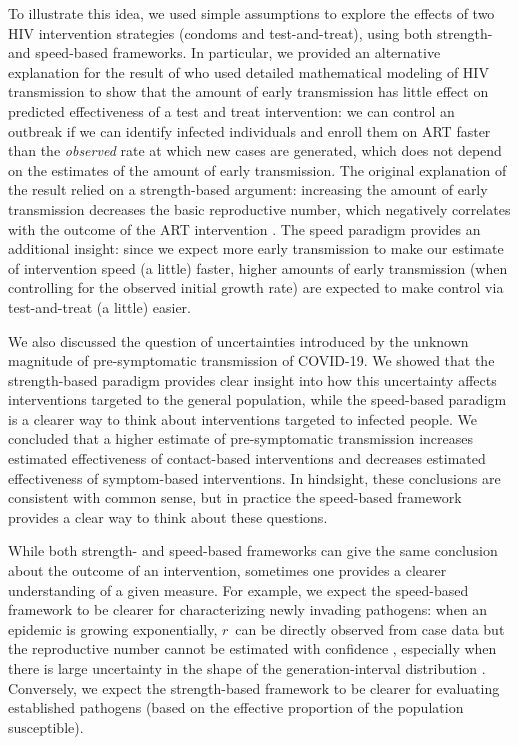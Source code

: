 \documentclass[12pt]{article}
\newcommand{\rr}{\ensuremath{{r}}}
\begin{document}
To illustrate this idea, we used simple assumptions to explore the effects of two HIV intervention strategies (condoms and test-and-treat), using both strength- and speed-based frameworks.
In particular, we provided an alternative explanation for the result of \cite{eaton2014proportion} who used detailed mathematical modeling of HIV transmission to show that the amount of early transmission has little effect on predicted effectiveness of a test and treat intervention:
we can control an outbreak if we can identify infected individuals and enroll them on ART faster than the \emph{observed} rate at which new cases are generated, which does not depend on the estimates of the amount of early transmission.
The original explanation of the result relied on a strength-based argument: increasing the amount of early transmission decreases the basic reproductive number, which negatively correlates with the outcome of the ART intervention \citep{eaton2014proportion}.
The speed paradigm provides an additional insight: since we expect more early transmission to make our estimate of intervention speed (a little) faster, higher amounts of early transmission (when controlling for the observed initial growth rate) are expected to make control via test-and-treat (a little) easier.

We also discussed the question of uncertainties introduced by the unknown magnitude of pre-symptomatic transmission of COVID-19. We showed that the strength-based paradigm provides clear insight into how this uncertainty affects interventions targeted to the general population, while the speed-based paradigm is a clearer way to think about interventions targeted to infected people. We concluded that a higher estimate of pre-symptomatic transmission increases estimated effectiveness of contact-based interventions and decreases estimated effectiveness of symptom-based interventions. In hindsight, these conclusions are consistent with common sense, but in practice the speed-based framework provides a clear way to think about these questions.

While both strength- and speed-based frameworks can give the same conclusion about the outcome of an intervention, sometimes one provides a clearer understanding of a given measure.
For example, we expect the speed-based framework to be clearer for characterizing newly invading pathogens: when an epidemic is growing exponentially, \rr\ can be directly observed from case data but the reproductive number cannot be estimated with confidence \citep{weitz2015modeling}, especially when there is large uncertainty in the shape of the generation-interval distribution \citep{park2020reconciling}.
Conversely, we expect the strength-based framework to be clearer for evaluating established pathogens (based on the effective proportion of the population susceptible).
\end{document}
